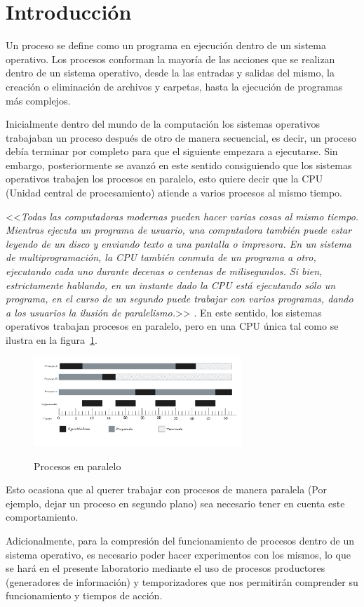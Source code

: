 \section{Introducción}
Un proceso se define como un programa en ejecución dentro de un sistema operativo. Los procesos conforman la mayoría de las acciones que se realizan dentro de un sistema operativo, desde la las entradas y salidas del mismo, la creación o eliminación de archivos y carpetas, hasta la ejecución de programas más complejos.

Inicialmente dentro del mundo de la computación los sistemas operativos trabajaban un proceso después de otro de manera secuencial, es decir, un proceso debía terminar por completo para que el siguiente empezara a ejecutarse. Sin embargo, posteriormente se avanzó en este sentido consiguiendo que los sistemas operativos trabajen los procesos en paralelo, esto quiere decir que la CPU (Unidad central de procesamiento) atiende a varios procesos al mismo tiempo.

<<\textit{Todas las computadoras modernas pueden hacer varias cosas al mismo tiempo. Mientras ejecuta un programa de usuario, una computadora también puede estar leyendo de un disco y enviando texto a una pantalla o impresora. En un sistema de multiprogramación, la CPU también conmuta de un programa a otro, ejecutando cada uno durante decenas o centenas de milisegundos. Si bien, estrictamente hablando, en un instante dado la CPU está ejecutando sólo un programa, en el curso de un segundo puede trabajar con varios programas, dando a los usuarios la ilusión de paralelismo.}>> \parencite{tanenbaum1997sistemas}. En este sentido, los sistemas operativos trabajan procesos en paralelo, pero en una CPU única tal como se ilustra en la figura~\ref{fig:procesosParalelos}.

\begin{figure}[!ht]
    \centering
    \caption{Procesos en paralelo}
    \includegraphics[width=0.7\textwidth]{src/images/Procesos en paralelo.png}\label{fig:procesosParalelos}
\end{figure}

Esto ocasiona que al querer trabajar con procesos de manera paralela (Por ejemplo, dejar un proceso en segundo plano) sea necesario tener en cuenta este comportamiento.

Adicionalmente, para la compresión del funcionamiento de procesos dentro de un sistema operativo, es necesario poder hacer experimentos con los mismos, lo que se hará en el presente laboratorio mediante el uso de procesos productores (generadores de información) y temporizadores que nos permitirán comprender su funcionamiento y tiempos de acción.